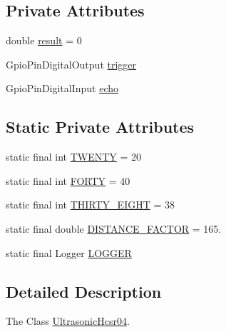 \subsection*{Private Attributes}
\begin{DoxyCompactItemize}
\item 
double \hyperlink{classcom_1_1libsensorj_1_1concretesensor_1_1UltrasonicHcsr04_aad32f417f9106fa8f3f2e2a7416f033b}{result} = 0
\item 
Gpio\+Pin\+Digital\+Output \hyperlink{classcom_1_1libsensorj_1_1concretesensor_1_1UltrasonicHcsr04_a13705a8251de22d0f52caa3e17d23376}{trigger}
\item 
Gpio\+Pin\+Digital\+Input \hyperlink{classcom_1_1libsensorj_1_1concretesensor_1_1UltrasonicHcsr04_a3695a560e3157a5e6f7896532d717456}{echo}
\end{DoxyCompactItemize}
\subsection*{Static Private Attributes}
\begin{DoxyCompactItemize}
\item 
static final int \hyperlink{classcom_1_1libsensorj_1_1concretesensor_1_1UltrasonicHcsr04_aa04a319fc4ef2ccf8de8a70bf27da2da}{T\+W\+E\+N\+T\+Y} = 20
\item 
static final int \hyperlink{classcom_1_1libsensorj_1_1concretesensor_1_1UltrasonicHcsr04_a7106eaa9f89d876a4749d502232964df}{F\+O\+R\+T\+Y} = 40
\item 
static final int \hyperlink{classcom_1_1libsensorj_1_1concretesensor_1_1UltrasonicHcsr04_a25452283296d3780a7fefbfa20e40a93}{T\+H\+I\+R\+T\+Y\+\_\+\+E\+I\+G\+H\+T} = 38
\item 
static final double \hyperlink{classcom_1_1libsensorj_1_1concretesensor_1_1UltrasonicHcsr04_a0483c4e470b1ab9e1a437fbeec6595e9}{D\+I\+S\+T\+A\+N\+C\+E\+\_\+\+F\+A\+C\+T\+O\+R} = 165.
\item 
static final Logger \hyperlink{classcom_1_1libsensorj_1_1concretesensor_1_1UltrasonicHcsr04_a9a3534d952f2668b69b0888b9e929abb}{L\+O\+G\+G\+E\+R}
\end{DoxyCompactItemize}


\subsection{Detailed Description}
The Class \hyperlink{classcom_1_1libsensorj_1_1concretesensor_1_1UltrasonicHcsr04}{Ultrasonic\+Hcsr04}. 

